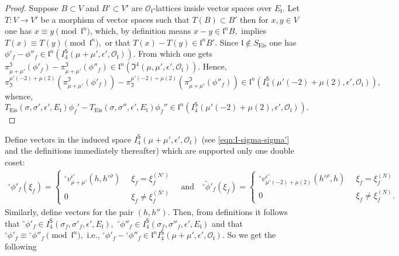 \documentclass[11pt]{amsart}
\begin{document}
\begin{proof}
Suppose $B \subset V$ and $B' \subset V'$ are $\mathcal{O}_\mathfrak{l}$-lattices inside vector spaces over $E_\mathfrak{l}$. Let $T: V \rightarrow V'$ 
be a morphism of vector spaces such that $T(B) \subset B'$ then for $x , y \in V$ one has $x \equiv y \pmod{\mathfrak{l}^n}$, which, by definition 
means $x - y \in \mathfrak{l}^n B,$ implies $T(x) \equiv T(y) \pmod{\mathfrak{l}^n},$ or that $ T(x) - T(y) \in \mathfrak{l}^n B' .$
Since $\mathfrak{l} \not\in S_{\text{Eis}}$ one has
$\phi'_f - \phi''_f  \in \mathfrak{l}^n \left( {I}_4^\mathsf{S}(\mu + \mu', \epsilon', \mathcal{O}_\mathfrak{l}) \right).$ 
From which one gets
$\pi_{\mu + \mu'}^\mathfrak{I} \left( \phi'_f\right) - \pi_{\mu + \mu'}^\mathfrak{I} \left( \phi''_f\right) \in \mathfrak{l}^n 
\left( {\mathfrak{I}}^4(\mu, \mu' , \epsilon', \mathcal{O}_\mathfrak{l}) \right)$. 
Hence, 
$$
\pi^{\mu'(-2) + \mu(2)}_\mathfrak{I} \left(\pi_{\mu + \mu'}^\mathfrak{I} \left( \phi'_f\right) \right) - 
\pi^{\mu'(-2) + \mu(2)}_\mathfrak{I} \left(\pi_{\mu + \mu'}^\mathfrak{I} \left( \phi''_f\right) \right)\in 
\mathfrak{l}^n  \left({I}_4^\mathsf{S}(\mu'(-2)+\mu(2), \epsilon',\mathcal{O}_\mathfrak{l}) \right),
$$
whence, 		
$$
T_{\text{Eis}}(\sigma, \sigma', \epsilon', E_\mathfrak{l})\phi_f' - T_{\text{Eis}}(\sigma, \sigma'', \epsilon', E_\mathfrak{l}) \phi_f'' \in 
\mathfrak{l}^n \left(  {I}_4^\mathsf{S}(\mu'(-2)+\mu(2), \epsilon', \mathcal{O}_\mathfrak{l}) \right).
$$
\end{proof}

Define vectors in the induced space
$I_4^\mathsf{S}(\mu+\mu', \epsilon', \mathcal{O}_\mathfrak{l})$ (see \eqref{eqn:I-sigma-sigma'} and the definitions immediately thereafter) which are 
supported only one double coset:
\begin{gather*}
	{^\circ}\phi'_f(\xi_f) = \begin{cases}
		{^\circ}v^{\epsilon'}_{\mu + \mu'}(h,h'^\rho) &\,\,\, \xi_f = \xi_f^{(N')}\\
		0 &\,\,\, \xi_f \neq \xi_f^{(N')}
	\end{cases} \quad \text{and}\quad 
	{^\circ}\tilde{\phi}'_f(\xi_f) = \begin{cases}
			{^\circ}v^{\epsilon'}_{\mu'(-2)+\mu(2)}(h'^\rho,h) &\,\,\, \xi_f = \xi_f^{(N)}\\
		0 &\,\,\, \xi_f \neq \xi_f^{(N)}.
	\end{cases}
\end{gather*}
Similarly, define vectors for the pair $(h,h'').$ 
Then, from definitions it follows that
${^\circ}\phi'_f \in I_4^\mathsf{S}(\sigma_f, \sigma'_f, \epsilon', E_\mathfrak{l}),$ 
${^\circ}\phi''_f \in I_4^\mathsf{S}(\sigma_f, \sigma''_f, \epsilon', E_\mathfrak{l})$
and that ${^\circ}\phi'_f \equiv  {^\circ}\phi''_f \pmod{\mathfrak{l}^n},$ i.e., 
$ {^\circ}\phi'_f -  {^\circ}\phi''_f \in\mathfrak{l}^nI_4^\mathsf{S}(\mu+\mu', \epsilon', \mathcal{O}_\mathfrak{l}).$ So we get the following
\end{document}
